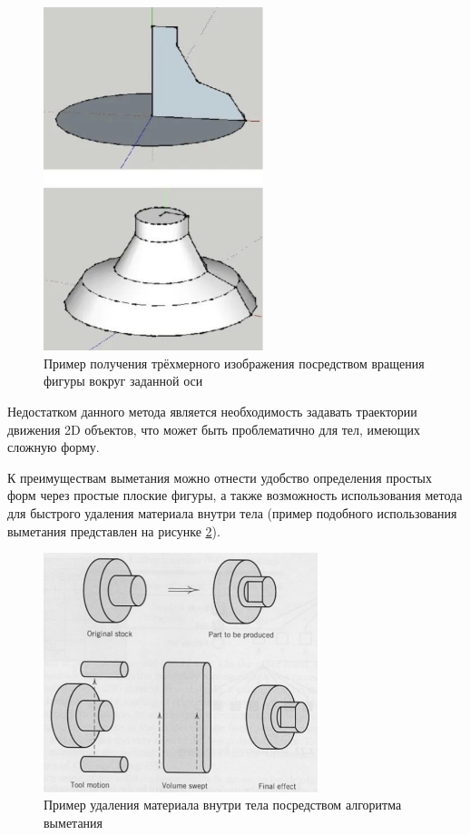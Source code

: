 \begin{figure}[h]
	\centering
	\captionsetup{justification=centering}
	\includegraphics[width=64mm]{img/sweeping.png}
	\caption{Пример получения трёхмерного изображения посредством 
		вращения фигуры вокруг заданной оси}
	\label{fig:sweeping}
\end{figure}

Недостатком данного метода является необходимость задавать траектории движения 2D объектов, что может быть проблематично для тел, имеющих сложную форму.

К преимуществам выметания можно отнести удобство определения простых форм через простые плоские фигуры, а также возможность использования метода для быстрого удаления материала внутри тела (пример подобного использования выметания представлен на рисунке \ref{fig:deleting}). 
 
\begin{figure}[h]
	\centering
	\captionsetup{justification=centering}
	\includegraphics[width=80mm]{img/deleting.png}
	\caption{Пример удаления материала внутри тела посредством 
		алгоритма выметания}
	\label{fig:deleting}
\end{figure}


